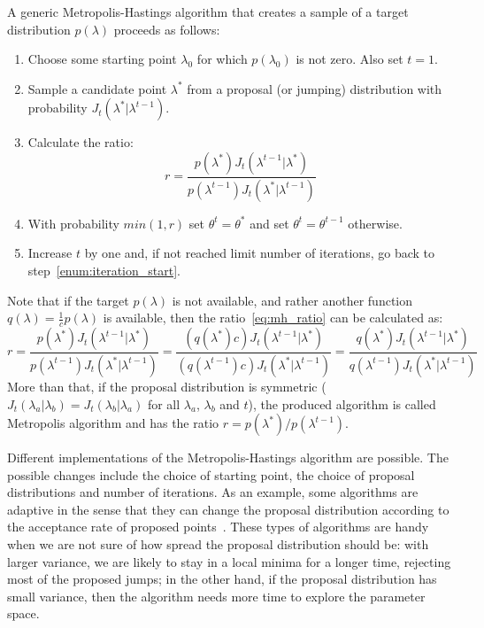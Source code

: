A generic Metropolis-Hastings algorithm that creates a sample of a 
target distribution $p (\lambda)$ proceeds as follows:
\begin{enumerate}
\item{Choose some starting point $\lambda_0$ for which $p (\lambda_0)$ 
    is not zero. Also set $t = 1$.}
\item{Sample a candidate point $\lambda^*$ from a proposal (or jumping) 
    distribution with probability $J_t (\lambda^* | \lambda^{t - 1})$.}
    \label{enum:iteration_start}
\item{Calculate the ratio:}
    \begin{equation}
        r = \frac{p (\lambda^*) J_t (\lambda^{t - 1} | \lambda^*)}
                 {p (\lambda^{t - 1}) J_t (\lambda^* | \lambda^{t - 1})}
        \label{eq:mh_ratio}
    \end{equation}
\item{With probability $min (1, r)$ set $\theta^t = \theta^*$ and set
    $\theta^t = \theta^{t - 1}$ otherwise.}
\item{Increase $t$ by one and, if not reached limit number of 
    iterations, go back to step~\ref{enum:iteration_start}.}
\end{enumerate}
Note that if the target $p (\lambda)$ is not available, and rather 
another function $q (\lambda) = \frac{1}{c}p(\lambda)$ is available, 
then the ratio~\ref{eq:mh_ratio} can be calculated as:
\begin{equation*}
    r = \frac{p (\lambda^*) J_t (\lambda^{t - 1} | \lambda^*)}
              {p (\lambda^{t - 1}) J_t (\lambda^* | \lambda^{t - 1})} 
      = \frac{(q (\lambda^*)c) J_t (\lambda^{t - 1} | \lambda^*)}
           {(q (\lambda^{t - 1})c) J_t (\lambda^* | \lambda^{t - 1})} 
      = \frac{q (\lambda^*) J_t (\lambda^{t - 1} | \lambda^*)}
              {q (\lambda^{t - 1}) J_t (\lambda^* | \lambda^{t - 1})}
\end{equation*}
More than that, if the proposal distribution is symmetric 
($J_t(\lambda_a|\lambda_b) = J_t(\lambda_b|\lambda_a)$ for all 
$\lambda_a$, $\lambda_b$ and $t$), the produced algorithm is called 
Metropolis algorithm and has the ratio 
$r = {p (\lambda^*)}/{p (\lambda^{t - 1})}$. 

Different implementations of the Metropolis-Hastings algorithm are 
possible. The possible changes include the choice of starting point,
the choice of proposal distributions and number of iterations. As an
example, some algorithms are adaptive in the sense that they can change 
the proposal distribution according to the acceptance rate of proposed 
points~\cite{Gelman2013}. These types of algorithms are handy when we
are not sure of how spread the proposal distribution should be: with
larger variance, we are likely to stay in a local minima for a longer 
time, rejecting most of the proposed jumps; in the other hand, if the 
proposal distribution has small variance, then the algorithm needs more
time to explore the parameter space.
